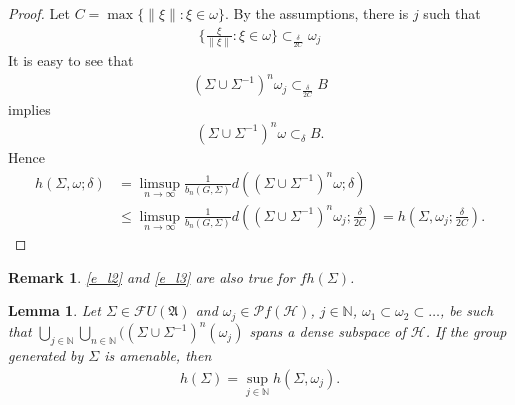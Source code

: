 \documentclass[a4paper,10pt]{amsart}
\newtheorem{lemma}{Lemma}[section]
\newtheorem{remark}{Remark}[section]
\newcommand{\AAA}{\mathfrak A}
\newcommand{\HHH}{\mathscr H} %
\newcommand{\PP}{\mathscr P}
\newcommand{\FF}{\mathscr F}
\newcommand{\N}{\mathbb N} %
\begin{document}
\begin{proof}
    Let $C = \max \{\|\xi\|: \xi \in \omega\}$.
    By the assumptions, there is $j$ such that 
    \begin{align*}
        \{\frac{\xi}{\|\xi\|}: \xi \in \omega\}  
        \subset_{\frac{\delta}{2C}} \omega_{j}
    \end{align*}
    It is easy to see that
    \begin{align*}
        (\Sigma \cup \Sigma^{-1})^{n}\omega_{j} \subset_{
        \frac{\delta}{2C}} B
    \end{align*}
    implies
    \begin{align*}
        (\Sigma \cup \Sigma^{-1})^{n} \omega
        \subset_{\delta} B.
    \end{align*}
    Hence
    \begin{align*}
        h(\Sigma, \omega; \delta) &=
           \limsup\limits_{n \rightarrow \infty}
           \frac{1}{b_{n}(G, \Sigma)}d\left 
           ((\Sigma \cup \Sigma^{-1})^{n}\omega
            ; \delta \right ) \\
           & \leq 
           \limsup\limits_{n \rightarrow \infty}
           \frac{1}{b_{n}(G, \Sigma)}d\left 
           ((\Sigma \cup \Sigma^{-1})^{n}\omega_j
           ; \frac{\delta}{2C} \right ) =  
           h(\Sigma, \omega_{j}; \frac{\delta}{2C}).
    \end{align*}
\end{proof}

\begin{remark}
    \cref{e_l2} and \cref{e_l3} are also true for $fh(\Sigma)$.
\end{remark}


\begin{lemma}
    Let $\Sigma \in \FF U(\AAA)$ and 
    $\omega_j \in \PP f(\HHH)$, $j \in \N$, 
    $\omega_1 \subset \omega_2
    \subset \ldots$, be such that $
    \bigcup_{j \in \N} \bigcup_{n \in \N}(
    (\Sigma \cup \Sigma^{-1})^{n}(\omega_{j})$ 
    spans a dense subspace of 
    $\HHH$. If the group generated by $\Sigma$ is amenable, then
    \begin{align*}
        h(\Sigma) = \sup_{j \in \N}h(\Sigma, \omega_{j}).
    \end{align*}
\end{lemma}
\end{document}
